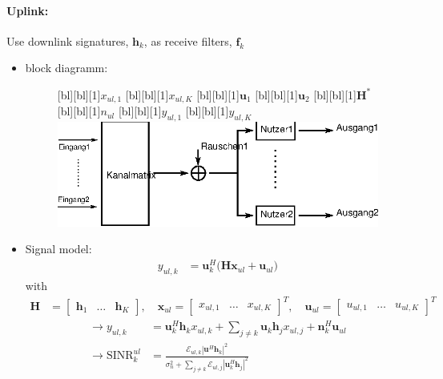 \documentclass[a4paper, 10pt]{article}
\begin{document}
\paragraph{Uplink:} 
Use downlink signatures, $\mathbf{h}_k$, as receive filters, $\mathbf{f}_k$
\begin{itemize}
	\item block diagramm: 
	\begin{figure}[ht]
		\centering	
		[bl][bl][1]{$x_{ul,1} $}
		[bl][bl][1]{$x_{ul,K} $}
		[bl][bl][1]{$\mathbf{u}_1 $}
		[bl][bl][1]{$\mathbf{u}_2 $}
		[bl][bl][1]{$\mathbf{H}^* $}
		[bl][bl][1]{$n_{ul} $}
		[bl][bl][1]{$y_{ul,1} $}
		[bl][bl][1]{$y_{ul,K} $}
		\includegraphics[scale=0.8]{Uplink_MIMO}		
	\end{figure}
	\item Signal model:
	\begin{align*}
		y_{ul,k} &= \mathbf{u}_k^H\bigl(\mathbf{Hx}_{ul} + \mathbf{u}_{ul}\bigr) 
	\end{align*}	
		with 
	\begin{align*}
		\mathbf{H} &= 
		\begin{bmatrix}
			\mathbf{h}_1 & \ldots & \mathbf{h}_K
		\end{bmatrix} ,\quad \mathbf{x}_{ul} = 
		\begin{bmatrix}
			x_{ul,1} & \ldots & x_{ul,K}
		\end{bmatrix}^T , \quad \mathbf{u}_{ul} = 
		\begin{bmatrix}
			u_{ul,1} & \ldots & u_{ul,K}
		\end{bmatrix}^T 
	\end{align*}		
	\begin{align}
		\rightarrow y_{ul,k} &= \mathbf{u}_k^H\mathbf{h}_kx_{ul,k} + \sum\limits_{j \neq k}\mathbf{u}_k\mathbf{h}_jx_{ul,j} + \mathbf{n}_k^H\mathbf{u}_{ul}\\
		\rightarrow \text{SINR}_k^{ul} &= \frac{\mathcal{E}_{ul,k}|\mathbf{u}^H\mathbf{h}_k|^2}{\sigma_n^2 + \sum\limits_{j\neq k}\mathcal{E}_{ul,j}|\mathbf{u}_k^H\mathbf{h}_j|^2}\label{eq:Formel_8}

\end{align}
\end{itemize}
\end{document}
